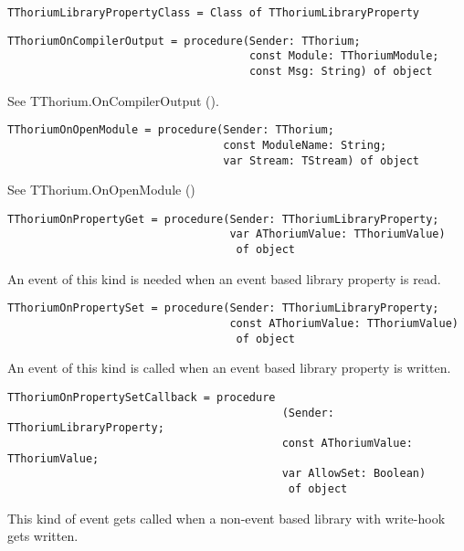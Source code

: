 \begin{verbatim}
TThoriumLibraryPropertyClass = Class of TThoriumLibraryProperty
\end{verbatim}
\label{thoriumcorepkg:thorium:tthoriumlibrarypropertyclass}



\begin{verbatim}
TThoriumOnCompilerOutput = procedure(Sender: TThorium;
                                     const Module: TThoriumModule;
                                     const Msg: String) of object
\end{verbatim}
\label{thoriumcorepkg:thorium:tthoriumoncompileroutput}
See TThorium.OnCompilerOutput (\pageref{thoriumcorepkg:thorium:tthorium:oncompileroutput}).


\begin{verbatim}
TThoriumOnOpenModule = procedure(Sender: TThorium;
                                 const ModuleName: String;
                                 var Stream: TStream) of object
\end{verbatim}
\label{thoriumcorepkg:thorium:tthoriumonopenmodule}
See TThorium.OnOpenModule (\pageref{thoriumcorepkg:thorium:tthorium:onopenmodule})


\begin{verbatim}
TThoriumOnPropertyGet = procedure(Sender: TThoriumLibraryProperty;
                                  var AThoriumValue: TThoriumValue)
                                   of object
\end{verbatim}
\label{thoriumcorepkg:thorium:tthoriumonpropertyget}
An event of this kind is needed when an event based library property is read.


\begin{verbatim}
TThoriumOnPropertySet = procedure(Sender: TThoriumLibraryProperty;
                                  const AThoriumValue: TThoriumValue)
                                   of object
\end{verbatim}
\label{thoriumcorepkg:thorium:tthoriumonpropertyset}
An event of this kind is called when an event based library property is written.


\begin{verbatim}
TThoriumOnPropertySetCallback = procedure
                                          (Sender: TThoriumLibraryProperty;
                                          const AThoriumValue: TThoriumValue;
                                          var AllowSet: Boolean)
                                           of object
\end{verbatim}
\label{thoriumcorepkg:thorium:tthoriumonpropertysetcallback}
This kind of event gets called when a non-event based library with write-hook gets written.


